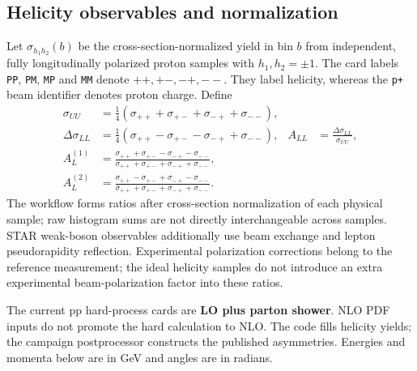 \documentclass[11pt,a4paper]{article}
\begin{document}
\subsection*{Helicity observables and normalization}
Let $\sigma_{h_1h_2}(b)$ be the cross-section-normalized yield in bin $b$ from
independent, fully longitudinally polarized proton samples with
$h_1,h_2=\pm1$. The card labels \texttt{PP}, \texttt{PM}, \texttt{MP} and
\texttt{MM} denote $++,+-,-+,--$. They label helicity, whereas the
\texttt{p+} beam identifier denotes proton charge. Define
\begin{align}
 \sigma_{UU} &= \tfrac14(\sigma_{++}+\sigma_{+-}+\sigma_{-+}+\sigma_{--}),\\
 \Delta\sigma_{LL} &= \tfrac14(\sigma_{++}-\sigma_{+-}-\sigma_{-+}+\sigma_{--}),
 & A_{LL}&=\frac{\Delta\sigma_{LL}}{\sigma_{UU}},\\
 A_L^{(1)} &= \frac{\sigma_{++}+\sigma_{+-}-\sigma_{-+}-\sigma_{--}}
 {\sigma_{++}+\sigma_{+-}+\sigma_{-+}+\sigma_{--}},\\
 A_L^{(2)}&=\frac{\sigma_{++}-\sigma_{+-}+\sigma_{-+}-\sigma_{--}}
 {\sigma_{++}+\sigma_{+-}+\sigma_{-+}+\sigma_{--}}.
\end{align}
The workflow forms ratios after cross-section normalization of each physical
sample; raw histogram sums are not directly interchangeable across samples.
STAR weak-boson observables additionally use beam exchange and lepton
pseudorapidity reflection. Experimental polarization corrections belong to
the reference measurement; the ideal helicity samples do not introduce an
extra experimental beam-polarization factor into these ratios.

The current pp hard-process cards are \textbf{LO plus parton shower}.
NLO PDF inputs do not promote the hard calculation to NLO. The code fills
helicity yields; the campaign postprocessor constructs the published
asymmetries. Energies and momenta below are in GeV and angles are in radians.
\clearpage
\end{document}
